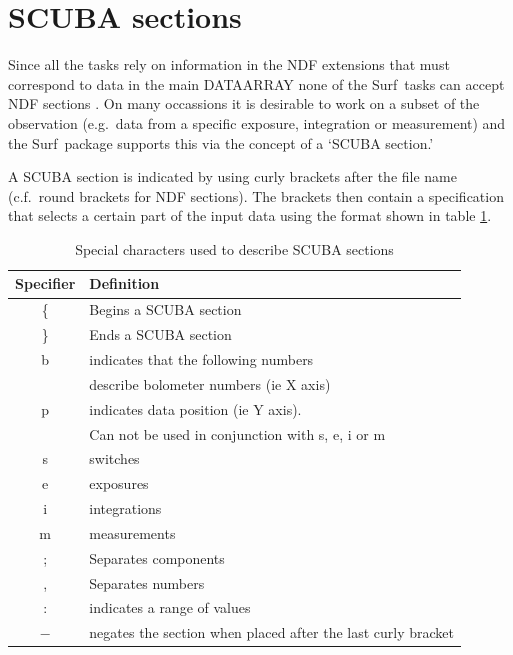 \documentclass[twoside,11pt]{article}
\newcommand{\scusoft}          {{\sc Surf}}
\newcommand{\xlabel}[1]{}
\renewcommand{\_}{\texttt{\symbol{95}}}
\begin{document}
\section{\xlabel{sections}SCUBA sections\label{sections}}

Since all the tasks rely on information in the NDF
extensions that must correspond to data in the main DATA\_ARRAY none of the
\scusoft\ tasks can accept NDF sections \cite{ndf}. On many occassions it
is desirable to work on a subset of the observation (e.g.\ data from a
specific exposure, integration or measurement) and the \scusoft\ package 
supports this via the concept of a `SCUBA section.'

A SCUBA section is indicated by using curly brackets after the file
name (c.f.\ round brackets for NDF sections). The brackets then contain
a specification that selects a certain part of the input data
using the format shown in table \ref{scusect}.

\begin{table}
\begin{center}
\begin{tabular}{cl}
\hline \hline
Specifier & Definition \\ \hline
\{  & Begins a SCUBA section \\
\}  & Ends a SCUBA section   \\
b  & indicates that the following numbers \\
   & describe bolometer numbers (ie X axis)\\
p  & indicates data position (ie Y axis). \\
   & Can not be used in conjunction with s, e, i or m\\
s  & switches \\
e  & exposures \\
i  & integrations \\
m  & measurements \\
;  & Separates components   \\
,  & Separates numbers \\
:  & indicates a range of values \\
$-$& negates the section when placed after the last curly bracket \\ \hline
\hline
\end{tabular}

\caption{Special characters used to describe SCUBA sections}

\label{scusect}
\end{center}
\end{table}
\end{document}
